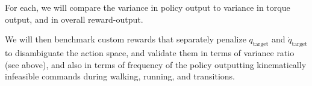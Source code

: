 \documentclass[
  11pt,
  letterpaper,
]{article}
\begin{document}
For each, we will compare the variance in policy output to variance in
torque output, and in overall reward-output.

We will then benchmark custom rewards that separately penalize
$q_{\text{target}}$ and $\dot{q}_{\text{target}}$ to disambiguate
the action space, and validate them in terms of variance ratio (see
above), and also in terms of frequency of the policy outputting
kinematically infeasible commands during walking, running, and
transitions.

%
\end{document}

